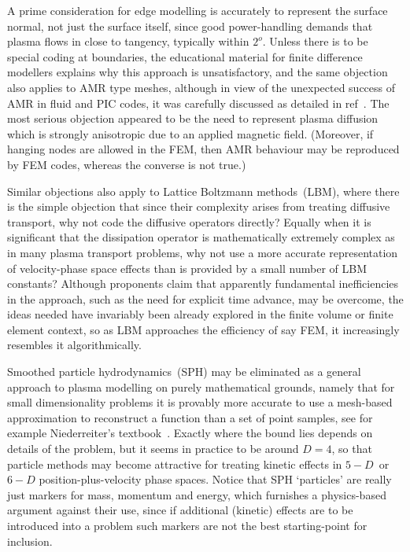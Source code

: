 A prime consideration for edge modelling is accurately to represent the surface
normal, not just the surface itself, since good power-handling demands that
plasma flows in close to tangency, typically within $2^{o}$. Unless there is to be
special coding at boundaries, the educational material for finite difference
modellers explains why this approach is unsatisfactory, and the same objection
also applies to AMR type meshes, although in view of the unexpected success of AMR
in fluid and PIC codes, it was carefully discussed as detailed in ref~\cite{y1r211}. The
most serious objection appeared to be the need to represent plasma diffusion
which is strongly anisotropic due to an applied magnetic field. (Moreover,
if hanging nodes are allowed in the FEM, then AMR behaviour may be reproduced by FEM codes,
whereas the converse is not true.)

Similar objections also apply to Lattice Boltzmann methods~(LBM), where there is the simple
objection that since their complexity arises from treating diffusive transport, why not code
the diffusive operators directly? Equally when it is significant that
the dissipation operator is mathematically extremely complex as
in many plasma transport problems, why not use a more accurate representation of
velocity-phase space effects than is provided by a small number of LBM constants?
Although proponents claim that apparently fundamental inefficiencies in the approach,
such as the need for explicit time advance, may be overcome, the ideas needed have
invariably been already explored in the finite volume or finite element context,
so as LBM approaches the efficiency of say FEM, it increasingly resembles it algorithmically.

Smoothed particle hydrodynamics~(SPH) may be eliminated as a general approach to
plasma modelling on purely mathematical grounds, namely that for small dimensionality
problems it is provably more accurate to use a mesh-based approximation to reconstruct a function
than a set of point samples, see for example Niederreiter's textbook~\cite{niederreiter}.
Exactly where the bound lies depends on details of the problem, but it seems in
practice to be around $D=4$, so that particle methods may become attractive for
treating kinetic effects in $5-D$~or~$6-D$ position-plus-velocity phase spaces.
Notice that SPH `particles' are really just markers for mass, momentum and energy,
which furnishes a physics-based argument against their use, since 
if additional (kinetic) effects are to be introduced into a problem such
markers are not the best starting-point for inclusion.

